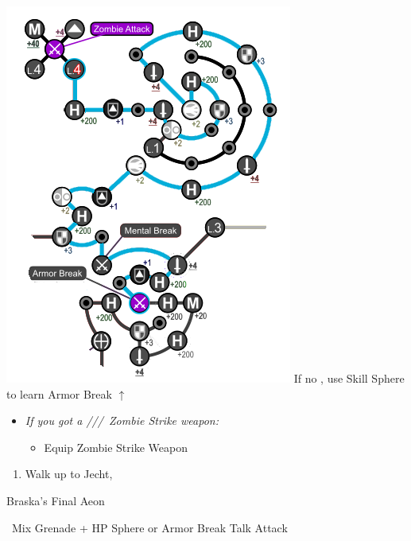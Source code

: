 \begin{spheregrid}
\begin{multicols}{2}
\begin{itemize}
            \includegraphics[width=.8\columnwidth]{graphics/Tidus_BFA}
            \rikkuf If no \od, use Skill Sphere to learn Armor Break $\uparrow$
        \end{itemize}
    \end{multicols}
\end{spheregrid}
\colstart
    \begin{equip}
        \begin{itemize}
            \item \textit{If you got a \lulu/\kimahri/\wakka/\rikku\ Zombie Strike weapon:}
            \begin{itemize}
                \item Equip Zombie Strike Weapon
            \end{itemize}
        \end{itemize}
    \end{equip}
    \begin{enumerate}[resume]
        \item Walk up to Jecht, \cs[4:30]
    \end{enumerate}
    \bothvfill\winvfill\lossvfill
    \begin{battle}[180000]{Braska's Final Aeon}
        \begin{itemize}
            \switch{\yuna}{\rikku}
            \rikkuf \od\ Mix Grenade + HP Sphere or Armor Break
            \tidusf Talk
            \switch{\auron}{\yuna}
            \summon{\bahamut}
            \bahamutf Attack
        \end{itemize}
    \end{battle}
